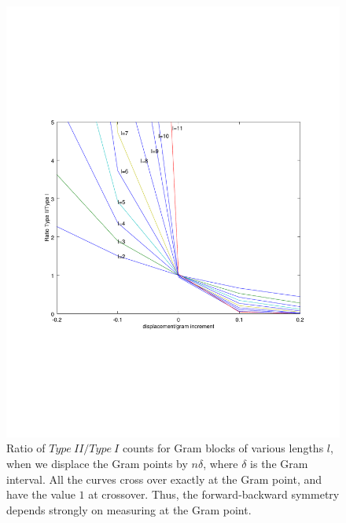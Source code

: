 \documentclass[twoside]{article}
\begin{document}
\begin{figure}
\centering
\includegraphics[width=1.1\textwidth]{typeIIratio}
\caption[]{ 
  Ratio of $Type~II/Type~I$ counts for Gram blocks of various lengths $l$, when we displace the Gram points by $n\delta$, where $\delta$ is the Gram interval. All the curves cross over exactly at the Gram point, and have the value $1$ at crossover. Thus, the forward-backward symmetry depends strongly on measuring at the Gram point.
 }
\vspace{1mm}
\label{typeIIratio}
\end{figure}
\end{document}
